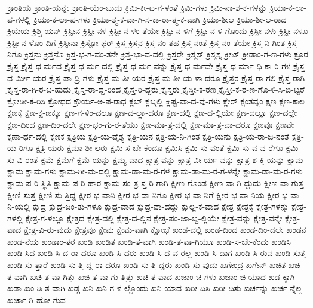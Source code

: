 {ಕ್ರಾಂತಿಯ
ಕ್ರಾಂತಿ-ಯನ್ನೇ
ಕ್ರಾಂತಿ-ಯೆಂ-ಬುದು
ಕ್ರಿಮಿ-ಕೀ-ಟ-ಗ-ಳಂತೆ
ಕ್ರಿಮಿ-ಗಳು
ಕ್ರಿಮಿ-ನಾ-ಶ-ಕ-ಗಳನ್ನು
ಕ್ರಿಯಾ-ಕ-ಲಾ-ಪ-ಗಳಲ್ಲಿ
ಕ್ರಿಯಾ-ಕ-ಲಾ-ಪ-ಗಳು
ಕ್ರಿಯಾ-ತ್ಮ-ಕ-ವಾ-ಗಿ-ಸ-ಕಾ-ರಾ-ತ್ಮ-ಕ-ವಾಗಿ
ಕ್ರಿಯಾ-ಶೀಲ
ಕ್ರಿಯಾ-ಶೀ-ಲ-ರಾದ
ಕ್ರಿಯೆಯ
ಕ್ರಿಶ್ಚಿ-ಯನ್
ಕ್ರಿಸ್ಟೀನ
ಕ್ರಿಸ್ಟೀ-ನಳ
ಕ್ರಿಸ್ಟೀ-ನ-ಳಂ-ತೆಯೇ
ಕ್ರಿಸ್ಟೀ-ನ-ಳಿಗೆ
ಕ್ರಿಸ್ಟೀ-ನ-ಳಿ-ಗೊಂದು
ಕ್ರಿಸ್ಟೀ-ನಳು
ಕ್ರಿಸ್ಟೀ-ನಳೂ
ಕ್ರಿಸ್ಟೀ-ನ-ಳೊಂ-ದಿಗೆ
ಕ್ರಿಸ್ಟೀನಾ
ಕ್ರಿಸ್ಟೋ-ಫರ್
ಕ್ರಿಸ್ತ
ಕ್ರಿಸ್ತನ
ಕ್ರಿಸ್ತ-ನಂ-ತಹ
ಕ್ರಿಸ್ತ-ನಂತೆ
ಕ್ರಿಸ್ತ-ನಂ-ತೆಯೇ
ಕ್ರಿಸ್ತ-ನಿ-ಗಿಂತ
ಕ್ರಿಸ್ತ-ನಿಗೂ
ಕ್ರಿಸ್ತನು
ಕ್ರಿಸ್ತನೊ
ಕ್ರಿಸ್ತ-ಭ-ಗ-ವಂ-ತನೇ
ಕ್ರಿಸ್ತ-ಭಾ-ವ-ದಲ್ಲಿ
ಕ್ರಿಸ್ತರೇ
ಕ್ರಿಸ್ಮಸ್
ಕ್ರಿಸ್ಮಸ್ನ
ಕ್ರೀಟ್
ಕ್ರೀಡಾಂ-ಗ-ಣ-ಗಳು
ಕ್ರೂರ
ಕ್ರೈಸ್ತ
ಕ್ರೈಸ್ತ-ಧ-ರ್ಮದ
ಕ್ರೈಸ್ತ-ಧ-ರ್ಮ-ದಲ್ಲಿ
ಕ್ರೈಸ್ತ-ಧ-ರ್ಮ-ವನ್ನು
ಕ್ರೈಸ್ತ-ಧ-ರ್ಮವೇ
ಕ್ರೈಸ್ತ-ಧ-ರ್ಮಾ-ಧಿ-ಕಾ-ರಿ-ಗಳ
ಕ್ರೈಸ್ತ-ಧ-ರ್ಮೀ-ಯರ
ಕ್ರೈಸ್ತ-ಪಾ-ದ್ರಿ-ಗಳು
ಕ್ರೈಸ್ತ-ಮ-ತೀ-ಯರ
ಕ್ರೈಸ್ತ-ಮ-ತೀ-ಯ-ಳಾ-ದರೂ
ಕ್ರೈಸ್ತರ
ಕ್ರೈಸ್ತ-ರಾ-ಗಲಿ
ಕ್ರೈಸ್ತ-ರಾಗಿ
ಕ್ರೈಸ್ತ-ರಾ-ಗಿ-ರ-ಬ-ಹುದು
ಕ್ರೈಸ್ತ-ರಾ-ದ್ದ-ರಿಂದ
ಕ್ರೈಸ್ತ-ರಿ-ದ್ದರು
ಕ್ರೈಸ್ತರು
ಕ್ರೈಸ್ತೀ-ಕ-ರಣ
ಕ್ರೈಸ್ತೀ-ಕ-ರ-ಣ-ಗೊ-ಳಿ-ಸಿ-ಬಿ-ಟ್ಟರೆ
ಕ್ರೋಡೀ-ಕ-ರಿಸಿ
ಕ್ರೋಧದ
ಕ್ರೌರ್ಯ-ಅ-ಪ-ರಾಧ
ಕ್ಲಬ್
ಕ್ಲಬ್ನಲ್ಲಿ
ಕ್ಲಿಷ್ಟ-ವಾ-ದ-ವು-ಗಳು
ಕ್ಲೇರ್
ಕ್ಷಂತವ್ಯಂ
ಕ್ಷಣ
ಕ್ಷಣ-ಕಾಲ
ಕ್ಷಣಕ್ಕೆ
ಕ್ಷಣ-ಕ್ಷ-ಣಕ್ಕೂ
ಕ್ಷಣ-ಗ-ಳಿಂ-ದಲೂ
ಕ್ಷಣ-ದ-ಲ್ಲಾ-ದರೂ
ಕ್ಷಣ-ದಲ್ಲಿ
ಕ್ಷಣ-ದ-ಲ್ಲಿಯೇ
ಕ್ಷಣ-ದಲ್ಲೂ
ಕ್ಷಣ-ದಲ್ಲೇ
ಕ್ಷಣ-ದಿಂದ
ಕ್ಷಣ-ದಿಂ-ದಲೇ
ಕ್ಷಣ-ಭಂ-ಗು-ರ-ತೆಯು
ಕ್ಷಣ-ಮಾ-ತ್ರ-ದಲ್ಲಿ
ಕ್ಷಣ-ಮಾ-ತ್ರ-ವಾ-ದರೂ
ಕ್ಷಣವೂ
ಕ್ಷಣವೇ
ಕ್ಷಣಾ-ರ್ಧ-ದಲ್ಲಿ
ಕ್ಷಣಿಕ
ಕ್ಷತ್ರಿಯ
ಕ್ಷತ್ರಿ-ಯ-ವೈಶ್ಯ
ಕ್ಷತ್ರಿ-ಯನ
ಕ್ಷತ್ರಿ-ಯ-ನಿ-ಗಿಂತ
ಕ್ಷತ್ರಿ-ಯನು
ಕ್ಷತ್ರಿ-ಯ-ರಾ-ಜ-ನಂತೆ
ಕ್ಷತ್ರಿ-ಯ-ರಿಗೂ
ಕ್ಷತ್ರಿ-ಯರು
ಕ್ಷಮಾ-ಶೀ-ಲರು
ಕ್ಷಮಿ-ಸ-ಬೇ-ಕೆಂದೂ
ಕ್ಷಮಿಸಿ
ಕ್ಷಮಿ-ಸು-ವಂತೆ
ಕ್ಷಮಿ-ಸು-ವ-ವ-ರೆಗೂ
ಕ್ಷಮಿ-ಸು-ವಿ-ರಂತೆ
ಕ್ಷಮೆ
ಕ್ಷಮೆಗೆ
ಕ್ಷಮೆ-ಯನ್ನು
ಕ್ಷಮ್ಯ-ವಾದ
ಕ್ಷಾತ್ರ-ವನ್ನು
ಕ್ಷಾತ್ರ-ವೀ-ರ್ಯ-ವನ್ನು
ಕ್ಷಾತ್ರ-ಶ-ಕ್ತಿ-ಯನ್ನು
ಕ್ಷಾಮ
ಕ್ಷಾಮ
ಕ್ಷಾಮ-ಗಳು
ಕ್ಷಾಮ-ಗೀ-ಮ-ದಲ್ಲಿ
ಕ್ಷಾಮ-ಡಾ-ಮ-ರ-ಗಳ
ಕ್ಷಾಮ-ಡಾ-ಮ-ರ-ಗ-ಳನ್ನೇ
ಕ್ಷಾಮ-ಡಾ-ಮ-ರ-ಗಳು
ಕ್ಷಾಮ-ಪ-ರಿ-ಸ್ಥಿತಿ
ಕ್ಷಾಮ-ಪ-ರಿ-ಹಾರ
ಕ್ಷಾಮ-ಸಂ-ತ್ರ-ಸ್ತ-ರಿ-ಗಾಗಿ
ಕ್ಷೀಣ-ಗೊಂಡ
ಕ್ಷೀಣ-ವಾ-ಗಿ-ದ್ದುದು
ಕ್ಷೀಣ-ವಾ-ಗುತ್ತ
ಕ್ಷೀಣಿ-ಸುತ್ತ
ಕ್ಷೀಣಿ-ಸು-ತ್ತಿದ್ದ
ಕ್ಷೀರ-ಭ-ವಾನಿ
ಕ್ಷೀರ-ಭ-ವಾ-ನಿಗೂ
ಕ್ಷೀರ-ಭ-ವಾ-ನಿಗೆ
ಕ್ಷೀರ-ಭ-ವಾ-ನಿಯ
ಕ್ಷೀರ-ಭ-ವಾ-ನಿ-ಯಲ್ಲಿ
ಕ್ಷುದ್ರ
ಕ್ಷುದ್ರ-ಜಂ-ತು-ಗಳೂ
ಕ್ಷುದ್ರ-ವಾದ
ಕ್ಷುದ್ರ-ವಾ-ದದ್ದು
ಕ್ಷುಲ್ಲ-ಕ-ವಾದ
ಕ್ಷೇತ್ರ
ಕ್ಷೇತ್ರಕ್ಕೆ
ಕ್ಷೇತ್ರ-ಗಳನ್ನು
ಕ್ಷೇತ್ರ-ಗಳಲ್ಲಿ
ಕ್ಷೇತ್ರ-ಗ-ಳಲ್ಲೂ
ಕ್ಷೇತ್ರದ
ಕ್ಷೇತ್ರ-ದಲ್ಲಿ
ಕ್ಷೇತ್ರ-ದ-ಲ್ಲಿನ
ಕ್ಷೇತ್ರ-ಪಂ-ಜಾ-ಬ್ದ-ಲ್ಲಿಯೇ
ಕ್ಷೇತ್ರ-ವನ್ನು
ಕ್ಷೇತ್ರ-ವನ್ನೇ
ಕ್ಷೇತ್ರ-ವಾದ
ಕ್ಷೇತ್ರ-ವಿ-ರು-ವುದು
ಕ್ಷೇತ್ರವೂ
ಕ್ಷೇಮ
ಕ್ಷೇಮ-ವಾಗಿ
ಕ್ಷೋಭೆ
ಖಂಡ-ದಲ್ಲಿ
ಖಂಡ-ದಿಂದ
ಖಂಡ-ದಿಂ-ದಲೇ
ಖಂಡನ
ಖಂಡ-ನೆಯ
ಖಂಡಾಂ-ತರ
ಖಂಡಿ
ಖಂಡಿತ
ಖಂಡಿ-ತ-ವಾಗಿ
ಖಂಡಿ-ತ-ವಾ-ಗಿಯೂ
ಖಂಡಿ-ಸ-ಬೇ-ಕೆಂದು
ಖಂಡಿಸಿ
ಖಂಡಿ-ಸಿದ
ಖಂಡಿ-ಸಿ-ದ-ರಾ-ದರೂ
ಖಂಡಿ-ಸಿ-ದರು
ಖಂಡಿ-ಸಿ-ದ-ವ-ರಲ್ಲ
ಖಂಡಿ-ಸಿ-ದಾಗ
ಖಂಡಿ-ಸಿ-ರುವ
ಖಂಡಿ-ಸುತ್ತ
ಖಂಡಿ-ಸು-ತ್ತಾರೆ
ಖಂಡಿ-ಸು-ತ್ತಿ-ದ್ದ-ರಾ-ದರೂ
ಖಂಡಿ-ಸು-ತ್ತಿ-ದ್ದರು
ಖಂಡಿ-ಸು-ವುದು
ಖಗೇಂದ್ರ
ಖಗೇನ್
ಖಚಿತ
ಖಚಿ-ತ-ವಾಗಿ
ಖಚಿ-ತ-ವಾ-ಗಿತ್ತು
ಖಚಿ-ತ-ವಾ-ಗು-ತ್ತಿತ್ತು
ಖಚಿ-ತ-ವಾದ
ಖಜಾಂ-ಚಿ-ಗಳು
ಖಜಾಂ-ಚಿ-ಯಾದ
ಖಡ-ಕ್ಕಾಗಿ
ಖಡಾ-ಖಂ-ಡಿ-ತ-ವಾಗಿ
ಖಡ್ಗ
ಖನಿ
ಖನಿ-ಗ-ಳ-ಲ್ಲೊಂದು
ಖನಿ-ಯಾದ
ಖರೀ-ದಿಸಿ
ಖರೀ-ದಿಸು
ಖರ್ಚನ್ನು
ಖರ್ಚ-ನ್ನೆಲ್ಲ
ಖರ್ಚಾ-ಗಿ-ಹೋ-ಗುವ
}
